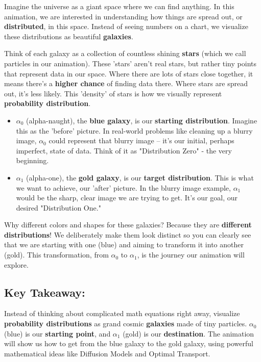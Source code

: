 \documentclass{article}
\begin{document}
Imagine the universe as a giant space where we can find anything. In this animation, we are interested in understanding how things are spread out, or \textbf{distributed}, in this space.  Instead of seeing numbers on a chart, we visualize these distributions as beautiful \textbf{galaxies}.

Think of each galaxy as a collection of countless shining \textbf{stars} (which we call particles in our animation).  These 'stars' aren't real stars, but rather tiny points that represent data in our space. Where there are lots of stars close together, it means there's a \textbf{higher chance} of finding data there. Where stars are spread out, it's less likely.  This 'density' of stars is how we visually represent \textbf{probability distribution}.

\begin{itemize}
    \item \textbf{\( \alpha_0 \)} (alpha-naught), the \textbf{blue galaxy}, is our \textbf{starting distribution}. Imagine this as the 'before' picture. In real-world problems like cleaning up a blurry image, \( \alpha_0 \) could represent that blurry image – it's our initial, perhaps imperfect, state of data.  Think of it as "Distribution Zero" - the very beginning.
    \item \textbf{\( \alpha_1 \)} (alpha-one), the \textbf{gold galaxy}, is our \textbf{target distribution}. This is what we want to achieve, our 'after' picture. In the blurry image example, \( \alpha_1 \) would be the sharp, clear image we are trying to get. It's our goal, our desired "Distribution One."
\end{itemize}


Why different colors and shapes for these galaxies? Because they are \textbf{different distributions}!  We deliberately make them look distinct so you can clearly see that we are starting with one (blue) and aiming to transform it into another (gold).  This transformation, from \( \alpha_0 \) to \( \alpha_1 \), is the journey our animation will explore.

\subsection*{Key Takeaway:}

Instead of thinking about complicated math equations right away, visualize \textbf{probability distributions} as grand cosmic \textbf{galaxies} made of tiny particles.  \textbf{\( \alpha_0 \)} (blue) is our \textbf{starting point}, and \textbf{\( \alpha_1 \)} (gold) is our \textbf{destination}.  The animation will show us how to get from the blue galaxy to the gold galaxy, using powerful mathematical ideas like Diffusion Models and Optimal Transport.
\end{document}
